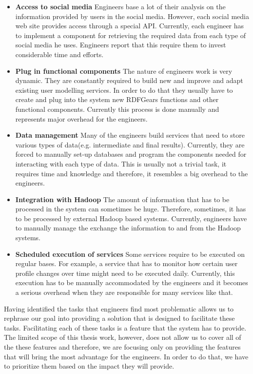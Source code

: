 \begin{itemize}

\item \textbf{Access to social media}
Engineers base a lot of their analysis on the information provided by users in the social media. However, each social media web site provides access through a special API. Currently, each engineer has to implement a component for retrieving the required data from each type of social media he uses. Engineers report that this require them to invest considerable time and efforts.

\item \textbf{Plug in functional components}
The nature of engineers work is very dynamic. They are constantly required to build new and improve and adapt existing user modelling services. In order to do that they usually have to create and plug into the system new RDFGears functions and other functional components. Currently this process is done manually and represents major overhead for the engineers.

\item \textbf{Data management} 
Many of the engineers build services that need to store various types of data(e.g. intermediate and final results). Currently, they are forced to manually set-up databases and program the components needed for interacting with each type of data. This is usually not a trivial task, it requires time and knowledge and therefore, it resembles a big overhead to the engineers.

 
\item \textbf{Integration with Hadoop}
The amount of information that has to be processed in the system can sometimes be huge. Therefore, sometimes, it has to be processed by external Hadoop based systems. Currently, engineers have to manually manage the exchange the information to and from the Hadoop systems.

\item \textbf{Scheduled execution of services}
Some services require to be executed on regular bases. For example, a service that has to monitor how certain user profile changes over time might need to be executed daily. Currently, this execution has to be manually accommodated by the engineers and it becomes a serious overhead when they are responsible for many services like that. 

\end{itemize}

Having identified the tasks that engineers find most problematic allows us to rephrase our goal into providing a solution that is designed to facilitate these tasks. Facilitating each of these tasks is a feature that the system has to provide. The limited scope of this thesis work, however, does not allow us to cover all of the these features and therefore, we are focusing only on providing the features that will bring the most advantage for the engineers. In order to do that, we have to prioritize them based on the impact they will provide. 

